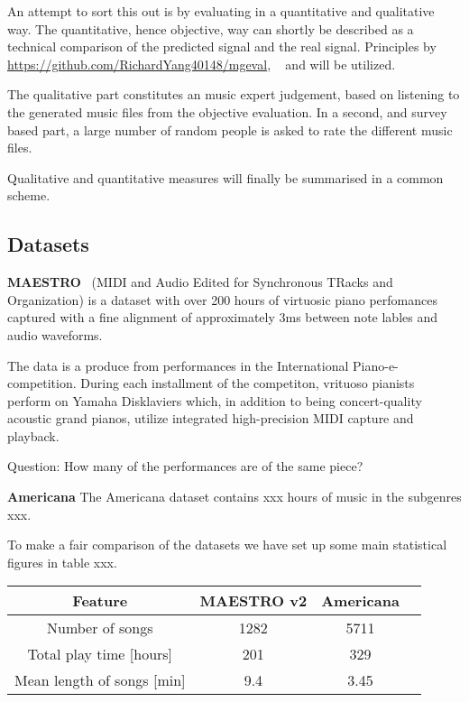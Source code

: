 \documentclass{IEEEtran}
\begin{document}
        An attempt to sort this out is by evaluating in a quantitative and qualitative way.
        The quantitative, hence objective, way can shortly be described as a technical
        comparison of the predicted signal and the real signal. Principles by
        \url{https://github.com/RichardYang40148/mgeval}, ~\cite{wu2020jazz} and
         will be utilized.
        
        The qualitative part constitutes an music expert judgement,
        based on listening to the generated music files from the objective evaluation.
        In a second, and survey based part, a large number of random people is asked
        to rate the different music files.
        
        Qualitative and quantitative measures will finally be summarised in a common scheme.
        
    \subsection{Datasets}

    \textbf{MAESTRO}~\cite{maestrodataset}
    (MIDI and Audio Edited for Synchronous TRacks and Organization)
    is a dataset with over 200 hours of virtuosic piano perfomances captured with 
    a fine alignment of approximately 3ms between note lables and audio waveforms.

    The data is a produce from performances in the International Piano-e-competition.
    During each installment of the competiton, vrituoso pianists perform on Yamaha
    Disklaviers which, in addition to being concert-quality acoustic grand pianos,
    utilize integrated high-precision MIDI capture and playback.

    

    Question: How many of the performances are of the same piece?

    \textbf{Americana}
    The Americana dataset contains xxx hours of music in the subgenres xxx.
    
    To make a fair comparison of the datasets we have set up some main statistical figures in table xxx.
    \begin{center}
        \begin{tabular}{||c c c c||} 
        \hline
        Feature & MAESTRO v2& Americana \\ [0.5ex] 
        \hline\hline
        Number of songs & 1282 & 5711 \\ 
        \hline
        Total play time [hours] & 201 & 329 \\
        \hline
        Mean length of songs [min] & 9.4 & 3.45  \\ [1ex] 
        \hline
       \end{tabular}
       \end{center}
\end{document}
